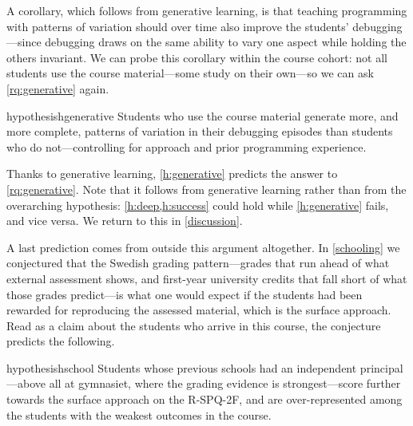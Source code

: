 A corollary, which follows from generative learning, is that teaching
programming with patterns of variation should over time also improve the
students' debugging---since debugging draws on the same ability to vary one
aspect while holding the others invariant.
We can probe this corollary within the course cohort: not all students use
the course material---some study on their own---so we can ask
\cref{rq:generative} again.

\begin{frame}
  \begin{restatable}{hypothesis}{hgenerative}\label{h:generative}
    Students who use the course material generate more, and more complete,
    patterns of variation in their debugging episodes than students who do
    not---controlling for approach and prior programming experience.
  \end{restatable}
\end{frame}

Thanks to generative learning, \cref{h:generative} predicts the answer to
\cref{rq:generative}.
Note that it follows from generative learning rather than from the
overarching hypothesis: \cref{h:deep,h:success} could hold while
\cref{h:generative} fails, and vice versa.
We return to this in \cref{discussion}.

A last prediction comes from outside this argument altogether.
In \cref{schooling} we conjectured that the Swedish grading pattern---grades
that run ahead of what external assessment shows, and first-year university
credits that fall short of what those grades predict---is what one would
expect if the students had been rewarded for reproducing the assessed
material, which is the surface approach.
Read as a claim about the students who arrive in this course, the conjecture
predicts the following.

\begin{frame}
  \begin{restatable}{hypothesis}{hschool}\label{h:school}
    Students whose previous schools had an independent principal---above
    all at gymnasiet, where the grading evidence is strongest---score
    further towards the surface approach on the R-SPQ-2F, and are
    over-represented among the students with the weakest outcomes in the
    course.
  \end{restatable}
\end{frame}

